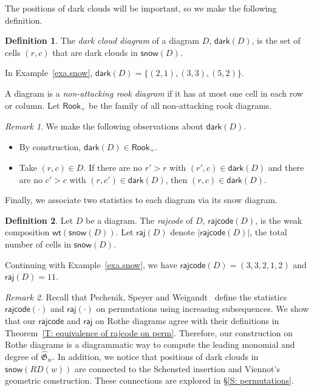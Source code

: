 \documentclass[10pt]{amsart}
\theoremstyle{plain}
\theoremstyle{plain}
\theoremstyle{definition}
\theoremstyle{definition}
\newtheorem{defn}[defn]{Definition}
\theoremstyle{definition}
\theoremstyle{plain}
\theoremstyle{plain}
\theoremstyle{plain}
\theoremstyle{plain}
\theoremstyle{plain}
\theoremstyle{remark}
\newtheorem{rem}[rem]{Remark}
\theoremstyle{remark}
\theoremstyle{plain}
\theoremstyle{plain}
\newcommand{\fG}{\mathfrak{G}}
\newcommand{\topGro}{\widehat{\fG}}
\newcommand{\wt}{\mathsf{wt}}
\newcommand{\dark}{\mathsf{dark}}
\newcommand{\snow}{\mathsf{snow}}
\newcommand{\rajcode}{\mathsf{rajcode}}
\newcommand{\raj}{\mathsf{raj}}
\newcommand{\Rook}{\mathsf{Rook}}
\newcommand{\definition}[1]{{\color{darkred}\emph{#1}}}
\begin{document}
The positions of dark clouds will be important,
so we make the following definition.

\begin{defn}
The \definition{dark cloud diagram} of a diagram $D$,
$\dark(D)$, 
is the set of cells $(r,c)$ that are dark clouds in $\snow(D)$.
\end{defn}

\begin{exa}
In Example~\ref{exa.snow},
$\dark(D) = \{(2,1), (3,3), (5,2) \}$.
\end{exa}

A diagram is a 
\definition{non-attacking rook diagram}
if it has at most one cell in each row or column.
Let $\Rook_+$ be the family
of all non-attacking rook diagrams.  


\begin{rem}
\label{R: Basic of dark}
We make the following observations about $\dark(D)$.
\begin{itemize}
\item By construction, $\dark(D) \in \Rook_+$.
\item Take $(r,c) \in D$.
If there are no $r' > r$ with $(r', c) \in \dark(D)$ 
and there are no $c' > c$ with $(r, c') \in \dark(D)$,
then $(r,c) \in \dark(D)$.
\end{itemize}
\end{rem}

Finally, we associate two statistics
to each diagram via its snow diagram.

\begin{defn}\label{defn.raj}
Let $D$ be a diagram.
The \definition{rajcode} of $D$,
$\rajcode(D)$, 
is the weak composition $\wt(\snow(D))$.
Let $\raj(D)$ denote $|\rajcode(D)|$,
the total number of cells in $\snow(D)$.
\end{defn}

\begin{exa}
Continuing with Example~\ref{exa.snow}, we have $\rajcode(D) = (3,3,2,1,2)$ and $\raj(D) = 11$.
\end{exa}

\begin{rem}
Recall that Pechenik, Speyer and Weigandt~\cite{PSW} 
define the statistics $\rajcode(\cdot)$ and $\raj(\cdot)$ on permutations
using increasing subsequences. 
We show that our $\rajcode$ and $\raj$ on Rothe diagrams 
agree with their definitions in Theorem~\ref{T: equivalence of rajcode on perm}.
Therefore, our construction on Rothe diagrams is a diagrammatic way
to compute the leading monomial and degree of $\topGro_w$.
In addition, we notice that positions of dark clouds in $\snow(RD(w))$
are connected to the Schensted insertion and Viennot's geometric construction.
These connections are explored in \S\ref{S: permutations}.
\end{rem}
\end{document}
